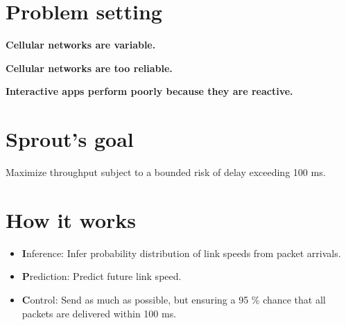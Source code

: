 \begin{multicols}{2}
\section*{Problem setting}
\begin{centering}
{\large \bf Cellular networks are variable.}
\begin{center}
\def\svgwidth{0.75\columnwidth}
\end{center}
\end{centering}

\begin{centering}
{\large \bf Cellular networks are too reliable.}
\begin{center}
{\bf \huge
\def\svgwidth{0.75\columnwidth}
}
\end{center}
\end{centering}

{\large \bf Interactive apps perform poorly because they are reactive.}

\section*{Sprout's goal}
{\large \bf
\begin{center}
Maximize throughput subject to a bounded risk of delay exceeding 100 ms.
\end{center}
}

\section*{How it works}
{\large \bf
\begin{itemize}
\item {\textbf Inference:} Infer probability distribution of link speeds from packet arrivals.
\item {\textbf Prediction:} Predict future link speed.
\item {\textbf Control:} Send as much as possible, but ensuring a 95 \% chance that all packets are delivered within 100 ms.
\end{itemize}
}
\begin{centering}
\def\svgwidth{0.85 \columnwidth}
\end{centering}


\end{multicols}
